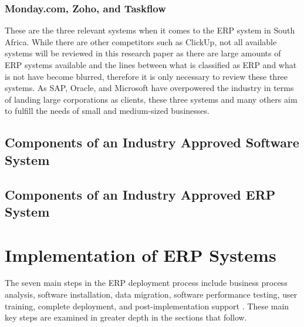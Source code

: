 \subsubsection{Monday.com, Zoho, and Taskflow}
\par{These are the three relevant systems when it comes to the ERP system in South Africa. While there are other competitors such as ClickUp, not all available systems will be reviewed in this research paper as there are large amounts of ERP systems available and the lines between what is classified as ERP and what is not have become blurred, therefore it is only necessary to review these three systems. As SAP, Oracle, and Microsoft have overpowered the industry in terms of landing large corporations as clients, these three systems and many others aim to fulfill the needs of small and medium-sized businesses.}
\subsection{Components of an Industry Approved Software System}
\subsection{Components of an Industry Approved ERP System}

\section{Implementation of ERP Systems}
\par{The seven main steps in the ERP deployment process include business process analysis, software installation, data migration, software performance testing, user training, complete deployment, and post-implementation support \citep{ly2020definitive}. These main key steps are examined in greater depth in the sections that follow.}
